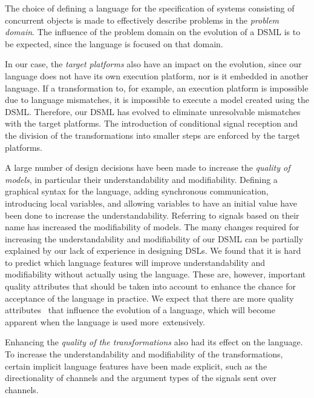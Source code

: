 The choice of defining a language for the specification of systems consisting of concurrent objects is made to effectively describe problems in the \emph{problem domain}.
The influence of the problem domain on the evolution of a DSML is to be expected, since the language is focused on that domain.

In our case, the \emph{target platforms} also have an impact on the evolution, since our language does not have its own execution platform, nor is it embedded in another language.
If a transformation to, for example, an execution platform is impossible due to language mismatches, it is impossible to execute a model created using the DSML.
Therefore, our DSML has evolved to eliminate unresolvable mismatches with the target platforms.
The introduction of conditional signal reception and the division of the transformations into smaller steps are enforced by the target platforms.

A large number of design decisions have been made to increase the \emph{quality of models}, in particular their understandability and modifiability.
Defining a graphical syntax for the language, adding synchronous communication, introducing local variables, and allowing variables to have an initial value have been done to increase the understandability.
Referring to signals based on their name has increased the modifiability of models.
The many changes required for increasing the understandability and modifiability of our DSML can be partially explained by our lack of experience in designing DSLs.
We found that it is hard to predict which language features will improve understandability and modifiability without actually using the language.
These are, however, important quality attributes that should be taken into account to enhance the chance for acceptance of the language in practice.
We expect that there are more quality attributes~\cite{Boehm1978} that influence the evolution of a language, which will become apparent when the language is used more~extensively.

Enhancing the \emph{quality of the transformations} also had its effect on the language.
To increase the understandability and modifiability of the transformations, certain implicit language features have been made explicit, such as the directionality of channels and the argument types of the signals sent over channels.
